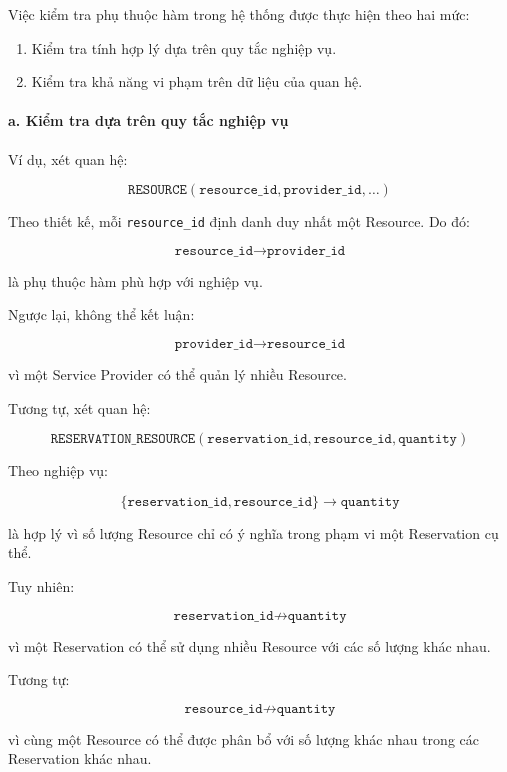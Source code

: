 Việc kiểm tra phụ thuộc hàm trong hệ thống được thực hiện theo hai mức:

\begin{enumerate}
\item Kiểm tra tính hợp lý dựa trên quy tắc nghiệp vụ.
\item Kiểm tra khả năng vi phạm trên dữ liệu của quan hệ.
\end{enumerate}

\paragraph{a. Kiểm tra dựa trên quy tắc nghiệp vụ}\mbox{}\par

Ví dụ, xét quan hệ:

$$
\texttt{RESOURCE}(
\texttt{resource\_id},
\texttt{provider\_id},
\ldots)
$$

Theo thiết kế, mỗi \texttt{resource\_id} định danh duy nhất một Resource. Do đó:

$$
\texttt{resource\_id}
\rightarrow
\texttt{provider\_id}
$$

là phụ thuộc hàm phù hợp với nghiệp vụ.

Ngược lại, không thể kết luận:

$$
\texttt{provider\_id}
\rightarrow
\texttt{resource\_id}
$$

vì một Service Provider có thể quản lý nhiều Resource.

Tương tự, xét quan hệ:

$$
\texttt{RESERVATION\_RESOURCE}(
\texttt{reservation\_id},
\texttt{resource\_id},
\texttt{quantity})
$$

Theo nghiệp vụ:

$$
\{
\texttt{reservation\_id},
\texttt{resource\_id}
\}
\rightarrow
\texttt{quantity}
$$

là hợp lý vì số lượng Resource chỉ có ý nghĩa trong phạm vi một Reservation cụ thể.

Tuy nhiên:

$$
\texttt{reservation\_id}
\not\rightarrow
\texttt{quantity}
$$

vì một Reservation có thể sử dụng nhiều Resource với các số lượng khác nhau.

Tương tự:

$$
\texttt{resource\_id}
\not\rightarrow
\texttt{quantity}
$$

vì cùng một Resource có thể được phân bổ với số lượng khác nhau trong các Reservation khác nhau.

